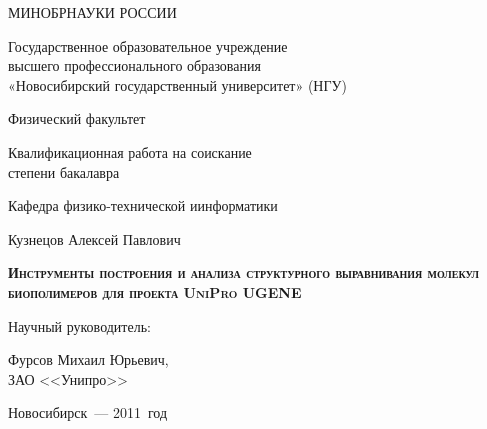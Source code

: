 \begin{titlepage}
\newpage

\thispagestyle{empty}
\begin {center}
МИНОБРНАУКИ РОССИИ

\vspace{0.3cm}

Государственное образовательное учреждение\\
высшего профессионального образования\\
«Новосибирский государственный университет» (НГУ)

\vspace{0.6cm}

Физический факультет

\vspace {2cm}

Квалификационная работа на соискание\\
степени бакалавра

\vspace {0.5cm}

Кафедра физико-технической иинформатики

\vspace {1cm}

Кузнецов Алексей Павлович

\vspace {1.5cm}

\textsc{\textbf{Инструменты построения и анализа структурного выравнивания молекул биополимеров для проекта UniPro UGENE}}

\vspace {1.5cm}

\begin{flushright}

Научный руководитель:

Фурсов Михаил Юрьевич,\\
ЗАО <<Унипро>>

\end{flushright}

\vspace {3cm}

Новосибирск~--- 2011~год
\end{center}

\end{titlepage}

